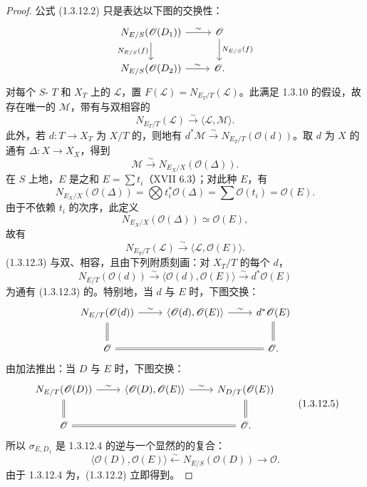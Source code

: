 \begin{proof}
公式 (1.3.12.2) 只是表达以下图的交换性：
\[\begin{tikzcd}N_{E/S}(\mathscr O(D_1))\ar[r,"\sim"]\ar[d,"{N_{E/S}(f)}"']&\mathscr O\ar[d,"{N_{E/S}(f)}"]\\N_{E/S}(\mathscr O(D_2))\ar[r,"\sim"]&\mathscr O.\end{tikzcd}\]
对每个 $S$- $T$ 和 $X_T$ 上的 $\mathscr L$，置 $F(\mathscr L)=N_{E_T/T}(\mathscr L)$。此满足 1.3.10 的假设，故存在唯一的 $\mathscr M$，带有与双相容的
\[N_{E_T/T}(\mathscr L)\xrightarrow\sim\langle\mathscr L,\mathscr M\rangle.\]
此外，若 $d:T\to X_T$ 为 $X/T$ 的，则地有 $d^*\mathscr M\xrightarrow\sim N_{E_T/T}(\mathscr O(d))$。取 $d$ 为 $X$ 的通有 $\Delta:X\to X_X$，得到
\[\mathscr M\xrightarrow\sim N_{E_X/X}(\mathscr O(\Delta)).\]
在 $S$ 上地，$E$ 是之和 $E=\sum t_i$（XVII 6.3）；对此种 $E$，有
\[N_{E_X/X}(\mathscr O(\Delta))=\bigotimes t_i^*\mathscr O(\Delta)=\sum\mathscr O(t_i)=\mathscr O(E).\]
由于不依赖 $t_i$ 的次序，此定义
\begin{equation}N_{E_X/X}(\mathscr O(\Delta))\simeq\mathscr O(E),\tag{1.3.12.3}\end{equation}
故有
\begin{equation}N_{E_T/T}(\mathscr L)\xrightarrow\sim\langle\mathscr L,\mathscr O(E)\rangle.\tag{1.3.12.4}\end{equation}
 (1.3.12.3) 与双、相容，且由下列附质刻画：对 $X_T/T$ 的每个 $d$，
\[N_{E/T}(\mathscr O(d))\xrightarrow\sim\langle\mathscr O(d),\mathscr O(E)\rangle\xrightarrow\sim d^*\mathscr O(E)\]
为通有 (1.3.12.3) 的。特别地，当 $d$ 与 $E$ 时，下图交换：
\[\begin{tikzcd}N_{E/T}(\mathscr O(d))\ar[r,"\sim"]\ar[d,equal]&\langle\mathscr O(d),\mathscr O(E)\rangle\ar[r,"\sim"]&d^*\mathscr O(E)\ar[d,equal]\\\mathscr O\ar[rr,equal]&&\mathscr O.\end{tikzcd}\]
由加法推出：当 $D$ 与 $E$ 时，下图交换：
\begin{equation}\begin{tikzcd}N_{E/T}(\mathscr O(D))\ar[r,"\sim"]\ar[d,equal]&\langle\mathscr O(D),\mathscr O(E)\rangle\ar[r,"\sim"]&N_{D/T}(\mathscr O(E))\ar[d,equal]\\\mathscr O\ar[rr,equal]&&\mathscr O.\end{tikzcd}\tag{1.3.12.5}\end{equation}
所以 $\sigma_{E,D_1}$ 是 1.3.12.4 的逆与一个显然的的复合：
\[\langle\mathscr O(D),\mathscr O(E)\rangle\xleftarrow\sim N_{E/S}(\mathscr O(D))\longrightarrow\mathscr O.\]
由于 1.3.12.4 为，(1.3.12.2) 立即得到。
\end{proof}
